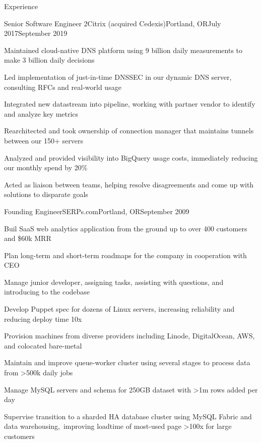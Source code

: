 \documentclass[letterpaper,10pt]{article}
\let\pt\pasttense
\begin{document}
\begin{res_section}{Experience}
  \begin{res_experienceitem}{Senior Software Engineer 2}{Citrix (acquired Cedexis)}{Portland, OR}{July 2017}{September 2019}
  \item Maintained cloud-native DNS platform using 9 billion daily measurements to make 3 billion daily decisions
  \item Led implementation of just-in-time DNSSEC in our dynamic DNS server, consulting RFCs and real-world usage
  \item Integrated new datastream into pipeline, working with partner vendor to identify and analyze key metrics
  \item Rearchitected and took ownership of connection manager that maintains tunnels between our 150+ servers
  \item Analyzed and provided visibility into BigQuery usage costs, immediately reducing our monthly spend by 20\%
  \item Acted as liaison between teams, helping resolve disagreements and come up with solutions to disparate goals
\end{res_experienceitem}
\begin{res_experienceitem}{Founding Engineer}{SERPs.com}{Portland, OR}{September 2009}{{\pt[Present]{March 2017}}}
  \item Buil\pt[d]{t} SaaS web analytics application from the ground up to over 400 customers and \$60k MRR
  \item Plan\pt{ned} long-term and short-term roadmaps for the company in cooperation with CEO
  \item Manage\pt{d} junior developer, assigning tasks, assisting with questions, and introducing to the codebase
  \item Develop\pt{ed} Puppet spec for dozens of Linux servers, increasing reliability and reducing deploy time 10x
  \item Provision\pt{ed} machines from diverse providers including Linode, DigitalOcean, AWS, and colocated bare-metal
  \item Maintain\pt{ed} and improve\pt{d} queue-worker cluster using several stages to process data from \textgreater500k daily jobs
  \item Manage\pt{d} MySQL servers and schema for 250GB dataset with \textgreater1m rows added per day
  \item Supervise\pt{d} transition to a sharded HA database cluster using MySQL Fabric and data warehousing,\
        improving loadtime of most-used page \textgreater100x for large customers

\end{res_experienceitem}
\end{res_section}
\end{document}
